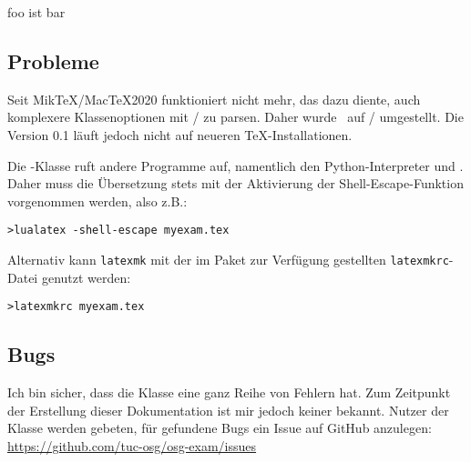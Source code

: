 \documentclass[
load=osgexam,
babel=ngerman
]{skdoc}
\begin{document}
 foo ist bar
\subsection{Probleme}
Seit Mik\TeX/Mac\TeX 2020 funktioniert  nicht mehr, das dazu diente, auch komplexere Klassenoptionen
mit / zu parsen. Daher wurde \thepkg\ auf / umgestellt. Die Version
0.1 läuft jedoch nicht auf neueren \TeX-Installationen.

Die \thepkg-Klasse ruft andere Programme auf, namentlich den Python-Interpreter und .
Daher muss die Übersetzung stets mit der Aktivierung der Shell-Escape-Funktion vorgenommen werden, also z.B.:\medskip

\noindent\verb!>lualatex -shell-escape myexam.tex!

\medskip
Alternativ kann \texttt{latexmk} mit der im Paket zur Verfügung gestellten \texttt{latexmkrc}-Datei genutzt werden:
\medskip

\noindent\verb!>latexmkrc myexam.tex!

\medskip
{}


\subsection{Bugs}
Ich bin sicher, dass die Klasse eine ganz Reihe von Fehlern hat. Zum Zeitpunkt der Erstellung dieser Dokumentation ist
mir jedoch keiner bekannt. Nutzer der Klasse werden gebeten, für gefundene Bugs ein Issue auf GitHub anzulegen:
\url{https://github.com/tuc-osg/osg-exam/issues} 
\end{document}
